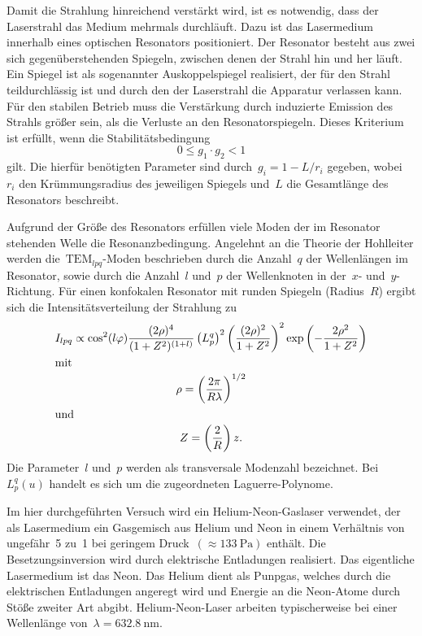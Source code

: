 Damit die Strahlung hinreichend verstärkt wird, ist es notwendig, dass der
Laserstrahl das Medium mehrmals durchläuft. Dazu ist das Lasermedium innerhalb
eines optischen Resonators positioniert. Der Resonator besteht aus zwei sich
gegenüberstehenden Spiegeln, zwischen denen der Strahl hin und her läuft. Ein
Spiegel ist als sogenannter Auskoppelspiegel realisiert, der für den Strahl
teildurchlässig ist und durch den der Laserstrahl die Apparatur verlassen kann.
Für den stabilen Betrieb muss die Verstärkung durch induzierte Emission des
Strahls größer sein, als die Verluste an den Resonatorspiegeln. Dieses Kriterium
ist erfüllt, wenn die Stabilitätsbedingung
%
\begin{equation}
  0\leq g_1\cdot g_2<1
  \label{eq:bedingung}
\end{equation}
%
gilt. Die hierfür benötigten Parameter sind durch~$g_i=1-L/r_i$ gegeben,
wobei~$r_i$ den Krümmungsradius des jeweiligen Spiegels und~$L$ die Gesamtlänge
des Resonators beschreibt.

Aufgrund der Größe des Resonators erfüllen viele Moden der im Resonator
stehenden Welle die Resonanzbedingung. Angelehnt an die Theorie der Hohlleiter
werden die~$\text{TEM}_{lpq}$-Moden beschrieben durch die Anzahl~$q$ der
Wellenlängen im Resonator, sowie durch die Anzahl~$l$ und~$p$ der Wellenknoten
in der~$x$- und~$y$-Richtung. Für einen konfokalen Resonator mit runden Spiegeln
(Radius~$R$) ergibt sich die Intensitätsverteilung der Strahlung zu
%
\begin{gather}
  I_{lpq}\propto\cos^2(l\varphi)\frac{(2\rho)^4}{(1+Z^2)^{(1+l)}}\left(L_p^q\right)^2\left(\frac{(2\rho)^2}{1+Z^2}\right)^2\exp\left(-\frac{2\rho^2}{1+Z^2}\right) \\
  \shortintertext{mit}
  \rho=\left(\frac{2\pi}{R\lambda}\right)^{1/2} \\
  \shortintertext{und}
  Z=\left(\frac{2}{R}\right)z.
\end{gather}
%
Die Parameter~$l$ und~$p$ werden als transversale Modenzahl bezeichnet.
Bei~$L_p^q(u)$ handelt es sich um die zugeordneten Laguerre-Polynome.

Im hier durchgeführten Versuch wird ein Helium-Neon-Gaslaser verwendet, der als
Lasermedium ein Gasgemisch aus Helium und Neon in einem Verhältnis von
ungefähr~\num{5} zu~\num{1} bei geringem Druck~$(\approx\SI{133}{\pascal})$
enthält. Die Besetzungsinversion wird durch elektrische Entladungen realisiert.
Das eigentliche Lasermedium ist das Neon. Das Helium dient als Punpgas, welches
durch die elektrischen Entladungen angeregt wird und Energie an die Neon-Atome
durch Stöße zweiter Art abgibt. Helium-Neon-Laser arbeiten typischerweise bei
einer Wellenlänge von~$\lambda=\SI{632.8}{\nano\metre}$.
